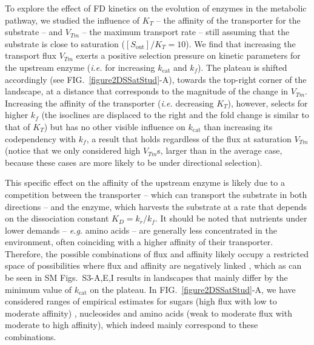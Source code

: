 \documentclass[nogrid,crop,final]{MBE2}%
\begin{document}
To explore the effect of FD kinetics on the evolution of enzymes in the metabolic pathway, we studied the influence of  $K_T$ -- the affinity of the transporter for the substrate -- and $V_{Tm}$ -- the maximum transport rate -- still assuming that the substrate is close to saturation ($[S_\text{out}]/K_T=10$). We find that increasing the transport flux $V_{Tm}$ exerts a positive selection pressure on kinetic parameters for the upstream enzyme (\textit{i.e.} for increasing $k_\text{cat}$ and $k_f$). The plateau is shifted accordingly (see FIG.~\ref{figure2DSSatStud}-A), towards the top-right corner of the landscape, at a distance that corresponds to the magnitude of the change in $V_{Tm}$. Increasing the affinity of the transporter (\textit{i.e.} decreasing $K_T$), however, selects for higher $k_{f}$ (the isoclines are displaced to the right and the fold change is similar to that of $K_T$) but has no other visible influence on $k_\text{cat}$ than increasing its codependency with $k_f$, a result that holds regardless of the flux at saturation $V_{Tm}$ (notice that we only considered high $V_{Tm}$s, larger than in the average case, because these cases are more likely to be under directional selection). 

This specific effect on the affinity of the upstream enzyme is likely due to a competition between the transporter -- which can transport the substrate in both directions -- and the enzyme, which harvests the substrate at a rate that depends on the dissociation constant $K_D=k_r/k_f$. It should be noted that nutrients under lower demands -- \textit{e.g.} amino acids -- are generally less concentrated in the environment, often coinciding with a higher affinity of their transporter. Therefore, the possible combinations of flux and affinity likely occupy a restricted space of possibilities where flux and affinity are negatively linked \citep{Gudelj10,Bosdriesz18}, which as can be seen in SM Figs.~S3-A,E,I results in landscapes that mainly differ by the minimum value of $k_\text{cat}$ on the plateau. In FIG.~\ref{figure2DSSatStud}-A, we have considered ranges of empirical estimates for sugars (high flux with low to moderate affinity) \citep{Stein86d,Maier02}, nucleosides \citep{Griffith96} and amino acids \citep{Stein86d,Zampieri2019} (weak to moderate flux with moderate to high affinity), which indeed mainly correspond to these combinations.   
\end{document}
